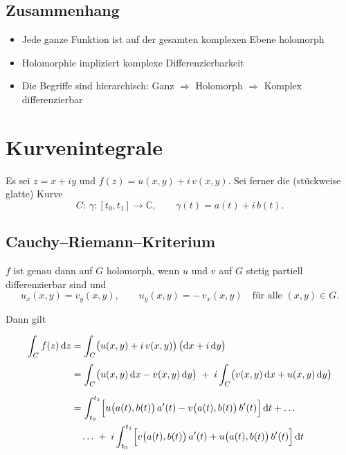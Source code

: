 \documentclass[a4paper,11pt,oneside,open=any,parskip=half, DIV=15]{scrreprt}
\begin{document}
   \subsection*{Zusammenhang}
      \begin{itemize}
         \item Jede ganze Funktion ist auf der gesamten komplexen Ebene holomorph
         \item Holomorphie impliziert komplexe Differenzierbarkeit
         \item Die Begriffe sind hierarchisch: Ganz \(\Rightarrow\) Holomorph \(\Rightarrow\) Komplex differenzierbar
      \end{itemize}

\section{Kurvenintegrale}

   Es sei \(z=x+iy\) und \(f(z)=u(x,y)+i\,v(x,y)\).
   Sei ferner die (stückweise glatte) Kurve
   \[
   C:\ \gamma:[t_0,t_1]\to\mathbb{C},\qquad \gamma(t)=a(t)+i\,b(t).
   \]

   \subsection*{Cauchy–Riemann–Kriterium}
      \(f\) ist genau dann auf \(G\) holomorph, wenn \(u\) und \(v\) auf \(G\) stetig partiell differenzierbar sind und
      \[
         u_x(x,y)=v_y(x,y),\qquad
         u_y(x,y)=-\,v_x(x,y)
         \quad\text{für alle }(x,y)\in G.
      \]

   Dann gilt
   \begin{importantbox}
      \[
         \begin{aligned}
            \int_{C} f(z)\,\mathrm dz
            &= \int_{C} \bigl(u(x,y)+i\,v(x,y)\bigr)\,\bigl(\mathrm dx + i\,\mathrm dy\bigr)\\[0.3em]
            &= \int_{C} \bigl(u(x,y)\,\mathrm dx - v(x,y)\,\mathrm dy\bigr)
               \;+\; i \int_{C} \bigl(v(x,y)\,\mathrm dx + u(x,y)\,\mathrm dy\bigr)\\[0.6em]
            &= \int_{t_0}^{t_1} \Bigl[u\bigl(a(t),b(t)\bigr)\,a'(t) - v\bigl(a(t),b(t)\bigr)\,b'(t)\Bigr]\,\mathrm dt + \ldots\\
            &\quad \ldots \;+\; i \int_{t_0}^{t_1} \Bigl[v\bigl(a(t),b(t)\bigr)\,a'(t) + u\bigl(a(t),b(t)\bigr)\,b'(t)\Bigr]\,\mathrm dt
         \end{aligned}
      \]
   \end{importantbox}
\end{document}
